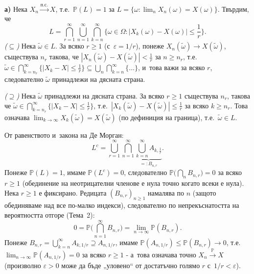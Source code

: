 \begin{proofbox}
\textbf{а)} Нека $X_n\xrightarrow{\text{п.с.}}X$, т.е.\ $\mathbb
P(L)=1$ за $L=\{\omega:\lim_n X_n(\omega)=X(\omega)\}$. Твърдим, че
\[
  L = \bigcap_{r=1}^{\infty}\bigcup_{n=1}^{\infty}\bigcap_{k=n}^{\infty} \Big\{\omega\in\Omega : |X_k(\omega)-X(\omega)|\le\frac1r\Big\}.
\]
\emph{($\subseteq$)} Нека $\tilde\omega\in L$. За всяко $r\ge1$
(с~$\varepsilon=1/r$), понеже $X_n(\tilde\omega)\to X(\tilde\omega)$,
съществува $n_r$ такова, че $|X_n(\tilde\omega)-X(\tilde\omega)|<
\tfrac1r$ за $n\ge n_r$, т.е.\ $\tilde\omega\in\bigcap_{k=n_r}^{\infty}
\{|X_k-X|\le\tfrac1r\}\subseteq\bigcup_n\bigcap_{k=n}^{\infty}\{\dots\}$,
и~това важи за всяко $r$, следователно $\tilde\omega$ принадлежи на
дясната страна.

\emph{($\supseteq$)} Нека $\tilde\omega$ принадлежи на дясната
страна. За всяко $r\ge1$ съществува $n_r$, такова че $\tilde\omega\in
\bigcap_{k=n_r}^{\infty}\{|X_k-X|\le\tfrac1r\}$, т.е.\
$|X_k(\tilde\omega)-X(\tilde\omega)|\le\tfrac1r$ за всяко $k\ge n_r$.
Това означава $\lim_{k\to\infty}X_k(\tilde\omega)=X(\tilde\omega)$
(по дефиниция на граница), т.е.\ $\tilde\omega\in L$.

От равенството и~закона на Де Морган:
\[
  L^c = \bigcup_{r=1}^{\infty}\bigcap_{n=1}^{\infty}\underbrace{\bigcup_{k=n}^{\infty}A_{k,\frac1r}}_{=:B_{n,r}}.
\]
Понеже $\mathbb P(L)=1$, имаме $\mathbb P(L^c)=0$, следователно
$\mathbb P\big(\bigcap_n B_{n,r}\big)=0$ за всяко $r\ge1$ (обединение
на неотрицателни членове е нула точно когато всеки е нула). Нека
$r\ge1$ е фиксирано. Редицата $(B_{n,r})_{n\ge1}$ намалява по $n$
(защото обединяваме над все по-малко индекси), следователно по
непрекъснатостта на вероятността отгоре (Тема~2):
\[
  0 = \mathbb P\Big(\bigcap_{n=1}^{\infty}B_{n,r}\Big) = \lim_{n\to\infty}\mathbb P(B_{n,r}).
\]
Понеже $B_{n,r}=\bigcup_{k=n}^{\infty}A_{k,1/r}\supseteq A_{n,1/r}$,
имаме $\mathbb P(A_{n,1/r})\le\mathbb P(B_{n,r})\to0$, т.е.
$\lim_{n\to\infty}\mathbb P(A_{n,1/r})=0$ за всяко $r\ge1$ - а~това
означава точно $X_n\xrightarrow{\mathbb P}X$ (произволно $\varepsilon>0$
може да бъде „уловено“ от достатъчно голямо $r$ с~$1/r<\varepsilon$).


\end{proofbox}
